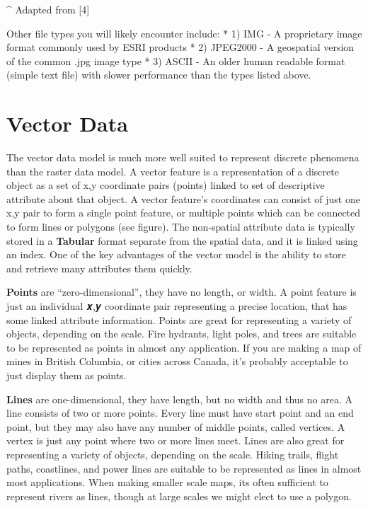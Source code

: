 \documentclass[
]{book}
\begin{document}
\^{} Adapted from {[}4{]}

Other file types you will likely encounter include:
* 1) IMG - A proprietary image format commonly used by ESRI products
* 2) JPEG2000 - A geospatial version of the common .jpg image type
* 3) ASCII - An older human readable format (simple text file) with slower performance than the types listed above.

\hypertarget{vector-data}{%
\section{Vector Data}\label{vector-data}}

The vector data model is much more well suited to represent discrete phenomena than the raster data model. A vector feature is a representation of a discrete object as a set of x,y coordinate pairs (points) linked to set of descriptive attribute about that object. A vector feature's coordinates can consist of just one x,y pair to form a single point feature, or multiple points which can be connected to form lines or polygons (see figure). The non-spatial attribute data is typically stored in a \textbf{Tabular} format separate from the spatial data, and it is linked using an index. One of the key advantages of the vector model is the ability to store and retrieve many attributes them quickly.

\textbf{Points} are ``zero-dimensional'', they have no length, or width. A point feature is just an individual 𝒙,𝒚 coordinate pair representing a precise location, that has some linked attribute information. Points are great for representing a variety of objects, depending on the scale. Fire hydrants, light poles, and trees are suitable to be represented as points in almost any application. If you are making a map of mines in British Columbia, or cities across Canada, it's probably acceptable to just display them as points.

\textbf{Lines} are one-dimensional, they have length, but no width and thus no area. A line consists of two or more points. Every line must have start point and an end point, but they may also have any number of middle points, called vertices. A vertex is just any point where two or more lines meet. Lines are also great for representing a variety of objects, depending on the scale. Hiking trails, flight paths, coastlines, and power lines are suitable to be represented as lines in almost most applications. When making smaller scale maps, its often sufficient to represent rivers as lines, though at large scales we might elect to use a polygon.
\end{document}

